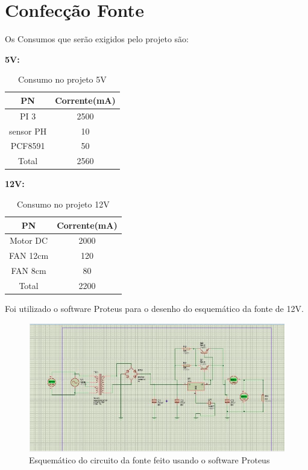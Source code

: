 \section{Confecção Fonte}
Os Consumos que serão exigidos pelo projeto são:  

\textbf{5V:}

\begin{table}[H]
	\centering
	\begin{tabular}{|l|l|}
		\hline
		\multicolumn{1}{|c|}{PN} & \multicolumn{1}{c|}{Corrente(mA)} \\ \hline
		\multicolumn{1}{|c|}{PI 3} & \multicolumn{1}{c|}{2500} \\ \hline
		\multicolumn{1}{|c|}{sensor PH} & \multicolumn{1}{c|}{10} \\ \hline
		\multicolumn{1}{|c|}{PCF8591} &   \multicolumn{1}{c|}{50} \\ \hline
		\multicolumn{1}{|c|}{Total}&\multicolumn{1}{c|}{2560} \\ \hline
	\end{tabular}
	\caption{Consumo no projeto 5V}
	\label{Consumo no projeto 5V}
\end{table} 

\textbf{12V:}

\begin{table}[H]
	\centering
	\begin{tabular}{|l|l|}
		\hline
		\multicolumn{1}{|c|}{PN} & \multicolumn{1}{c|}{Corrente(mA)} \\ \hline
		\multicolumn{1}{|c|}{Motor DC} & \multicolumn{1}{c|}{2000} \\ \hline
		\multicolumn{1}{|c|}{FAN 12cm} & \multicolumn{1}{c|}{120} \\ \hline
		\multicolumn{1}{|c|}{FAN 8cm} &   \multicolumn{1}{c|}{80} \\ \hline
		\multicolumn{1}{|c|}{Total}&\multicolumn{1}{c|}{2200} \\ \hline
	\end{tabular}
	\caption{Consumo no projeto 12V}
	\label{Consumo no projeto 12V}
\end{table} 

Foi utilizado o software Proteus para o desenho do esquemático da fonte de 12V.


\begin{figure}[H]
	\centering
	\includegraphics[width=15cm]{figuras/circuito_fonte_feita.png}
	\caption{Esquemático do circuito da fonte feito usando o software Proteus}
	\label{Circuito fonte feita}
\end{figure}

